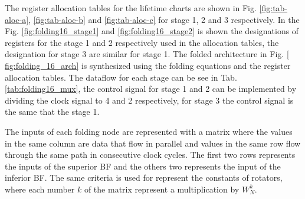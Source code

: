 \documentclass[journal,comsoc]{IEEEtran}
\begin{document}
The register allocation tables for the lifetime charts are shown in Fig. \ref{fig:tab-aloc-a}, \ref{fig:tab-aloc-b} and \ref{fig:tab-aloc-c} for stage 1, 2 and 3 respectively. In the Fig. \ref{fig:folding16_stage1} and \ref{fig:folding16_stage2} is shown the designations of registers for the stage 1 and 2 respectively used in the allocation tables, the designation for stage 3 are similar for stage 1. The folded architecture in Fig. \ref{ fig:folding_16_arch} is synthesized using the folding equations and the register allocation tables. The dataflow for each stage can be see in Tab. \ref{tab:folding16_mux}, the control signal for stage 1 and 2 can be implemented by dividing the clock signal to 4 and 2 respectively, for stage 3 the control signal is the same that the stage 1.

The inputs of each folding node are represented with a matrix where the values in the same column are data that flow in parallel and values in the same row flow through the same path in consecutive clock cycles. The first two rows represents the inputs of the superior BF and the others two represents the input of the inferior BF. 
The same criteria is used for represent the constants of rotators, where each number $k$ of the matrix represent a multiplication by $W^k_N$.
\end{document}
